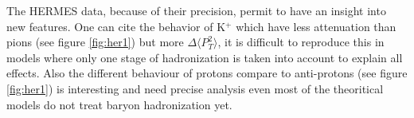 The HERMES data, because of their precision,
permit to have an insight into new features. One can cite the behavior of K$^+$
which have less attenuation than pions (see figure \ref{fig:her1}) but more 
$\Delta \langle P_T^2 \rangle$, it is difficult to reproduce this in 
models where only one stage of hadronization is taken into account to 
explain all effects.
Also the different behaviour of protons compare to anti-protons
(see figure \ref{fig:her1}) is interesting
and need precise analysis even most of the theoritical models do not treat 
baryon hadronization yet.

